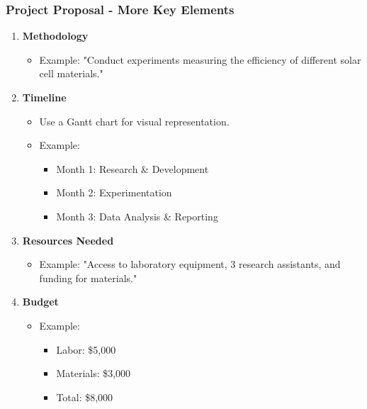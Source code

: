 \documentclass{beamer}
\begin{document}
\begin{frame}[fragile]
    \frametitle{Project Proposal - More Key Elements}
    \begin{enumerate}[resume]
        \item \textbf{Methodology}
            \begin{itemize}
                \item Example: "Conduct experiments measuring the efficiency of different solar cell materials."
            \end{itemize}
        \item \textbf{Timeline}
            \begin{itemize}
                \item Use a Gantt chart for visual representation.
                \item Example:
                \begin{itemize}
                    \item Month 1: Research \& Development
                    \item Month 2: Experimentation
                    \item Month 3: Data Analysis \& Reporting
                \end{itemize}
            \end{itemize}
        \item \textbf{Resources Needed}
            \begin{itemize}
                \item Example: "Access to laboratory equipment, 3 research assistants, and funding for materials."
            \end{itemize}
        \item \textbf{Budget}
            \begin{itemize}
                \item Example:
                \begin{itemize}
                    \item Labor: \$5,000
                    \item Materials: \$3,000
                    \item Total: \$8,000
                \end{itemize}
            \end{itemize}
    \end{enumerate}
\end{frame}
\end{document}
